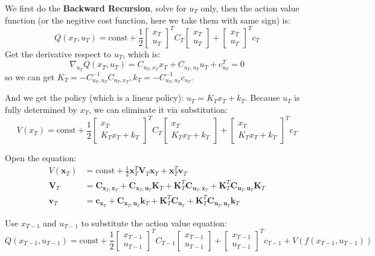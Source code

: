 \documentclass[10pt]{elegantbook}
\begin{document}
We first do the \textbf{Backward Recursion}, solve for $u_T$ only, then the action value function (or the negitive cost function, here
we take them with same sign) is:
\[ Q(x_T, u_T) = \text{const} +
\frac{1}{2} 
\begin{bmatrix}
    x_T \\ 
    u_T
\end{bmatrix}^T C_T
\begin{bmatrix}
    x_T \\ 
    u_T
\end{bmatrix} + 
\begin{bmatrix}
    x_T \\ 
    u_T
\end{bmatrix}^T c_T
\]
Get the derivative respect to $u_T$, which is:
\[ \nabla_{u_T} Q(x_T, u_T) = C_{u_T, x_T}x_T + C_{u_T,u_T}u_T + c_{u_T}^T = 0 \]
so we can get $K_T = -C_{u_T,u_T}^{-1}C_{u_T, x_T}, k_T = -C_{u_T,u_T}^{-1}c_{u_T}$.

And we get the policy (which is a linear policy): $u_T = K_Tx_T + k_T$. Because $u_T$ is fully
determined by $x_T$, we can eliminate it via substitution:
\[ V(x_T) = \text{const} + \frac{1}{2} 
\begin{bmatrix}
    x_T \\ 
    K_Tx_T + k_T
\end{bmatrix}^T C_T
\begin{bmatrix}
    x_T \\ 
    K_Tx_T + k_T
\end{bmatrix}
+
\begin{bmatrix}
    x_T \\ 
    K_Tx_T + k_T
\end{bmatrix}^T
c_T
\]

Open the equation:
\begin{align*}
V(\bm{x}_T) &= \text{const} + \frac{1}{2} \bm{x}_T^T \bm{V}_T \bm{x}_T + \bm{x}_T^T \bm{v}_T \\
\bm{V}_T &= \bm{C}_{\bm{x}_T,\bm{x}_T} + \bm{C}_{\bm{x}_T,\bm{u}_T} \bm{K}_T + \bm{K}_T^T \bm{C}_{\bm{u}_T,\bm{x}_T} + \bm{K}_T^T \bm{C}_{\bm{u}_T,\bm{u}_T} \bm{K}_T \\
\bm{v}_T &= \bm{c}_{\bm{x}_T} + \bm{C}_{\bm{x}_T,\bm{u}_T} \bm{k}_T + \bm{K}_T^T \bm{C}_{\bm{u}_T} + \bm{K}_T^T \bm{C}_{\bm{u}_T,\bm{u}_T} \bm{k}_T
\end{align*}

Use $x_{T-1}$ and $u_{T-1}$ to substitute the action value equation:
\[ Q(x_{T-1}, u_{T-1}) = \text{const} +
\frac{1}{2} 
\begin{bmatrix}
    x_{T-1} \\ 
    u_{T-1}
\end{bmatrix}^T C_{T-1}
\begin{bmatrix}
    x_{T-1} \\ 
    u_{T-1}
\end{bmatrix} + 
\begin{bmatrix}
    x_{T-1} \\ 
    u_{T-1}
\end{bmatrix}^T c_{T-1}
+
V(f(x_{T-1}, u_{T-1}))
\]
\end{document}
